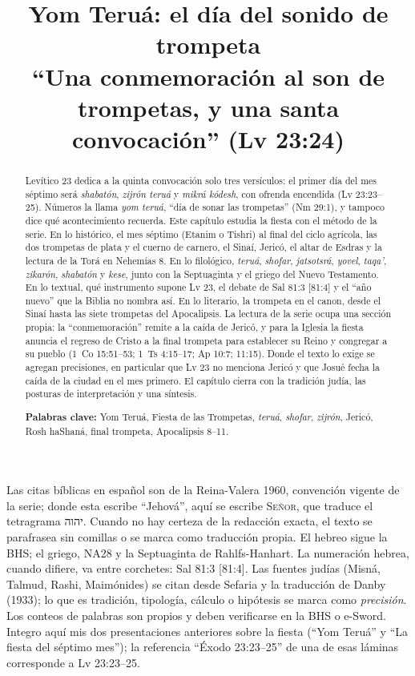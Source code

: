 \documentclass[11pt,letterpaper]{article}
\title{\color{tierraroja}\bfseries Yom Teruá: el día del sonido de trompeta\\[4pt]\large\color{sepia}\mdseries ``Una conmemoración al son de trompetas, y una santa convocación'' (Lv 23:24)}
\author{}\date{}
\newcommand{\heb}[1]{\mbox{\foreignlanguage{hebrew}{#1}}}
\newcommand{\SENOR}{\textsc{Señor}}
\begin{document}
\maketitle\thispagestyle{empty}

\begin{abstract}\noindent
Levítico 23 dedica a la quinta convocación solo tres versículos: el primer día del mes séptimo será \emph{shabatón}, \emph{zijrón teruá} y \emph{mikrá kódesh}, con ofrenda encendida (Lv 23:23--25). Números la llama \emph{yom teruá}, ``día de sonar las trompetas'' (Nm 29:1), y tampoco dice qué acontecimiento recuerda. Este capítulo estudia la fiesta con el método de la serie. En lo histórico, el mes séptimo (Etanim o Tishri) al final del ciclo agrícola, las dos trompetas de plata y el cuerno de carnero, el Sinaí, Jericó, el altar de Esdras y la lectura de la Torá en Nehemías 8. En lo filológico, \emph{teruá}, \emph{shofar}, \emph{jatsotsrá}, \emph{yovel}, \emph{taqa'}, \emph{zikarón}, \emph{shabatón} y \emph{kese}, junto con la Septuaginta y el griego del Nuevo Testamento. En lo textual, qué instrumento supone Lv 23, el debate de Sal 81:3 [81:4] y el ``año nuevo'' que la Biblia no nombra así. En lo literario, la trompeta en el canon, desde el Sinaí hasta las siete trompetas del Apocalipsis. La lectura de la serie ocupa una sección propia: la ``conmemoración'' remite a la caída de Jericó, y para la Iglesia la fiesta anuncia el regreso de Cristo a la final trompeta para establecer su Reino y congregar a su pueblo (1~Co 15:51--53; 1~Ts 4:15--17; Ap 10:7; 11:15). Donde el texto lo exige se agregan precisiones, en particular que Lv 23 no menciona Jericó y que Josué fecha la caída de la ciudad en el mes primero. El capítulo cierra con la tradición judía, las posturas de interpretación y una síntesis.
\par\smallskip\noindent\textbf{Palabras clave:} Yom Teruá, Fiesta de las Trompetas, \emph{teruá}, \emph{shofar}, \emph{zijrón}, Jericó, Rosh haShaná, final trompeta, Apocalipsis 8--11.\end{abstract}

\begin{nota}
Las citas bíblicas en español son de la Reina-Valera 1960, convención vigente de la serie; donde esta escribe ``Jehová'', aquí se escribe \SENOR, que traduce el tetragrama \heb{יהוה}. Cuando no hay certeza de la redacción exacta, el texto se parafrasea sin comillas o se marca como traducción propia. El hebreo sigue la BHS; el griego, NA28 y la Septuaginta de Rahlfs-Hanhart. La numeración hebrea, cuando difiere, va entre corchetes: Sal 81:3 [81:4]. Las fuentes judías (Misná, Talmud, Rashi, Maimónides) se citan desde Sefaria y la traducción de Danby (1933); lo que es tradición, tipología, cálculo o hipótesis se marca como \emph{precisión}. Los conteos de palabras son propios y deben verificarse en la BHS o e-Sword. Integro aquí mis dos presentaciones anteriores sobre la fiesta (``Yom Teruá'' y ``La fiesta del séptimo mes''); la referencia ``Éxodo 23:23--25'' de una de esas láminas corresponde a Lv 23:23--25.
\end{nota}
\end{document}

